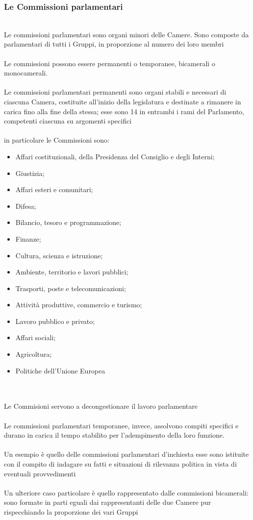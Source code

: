 \documentclass{report}
\begin{document}
\subsubsection{Le Commissioni parlamentari}
\\
Le commissioni parlamentari sono organi minori delle Camere. Sono composte da parlamentari di tutti i Gruppi, in proporzione al numero dei loro membri
\\
\\
Le commissioni possono essere permanenti o temporanee, bicamerali o monocamerali.
\\
\\
Le commissioni parlamentari permanenti sono organi stabili e necessari di ciascuna Camera, costituite all'inizio della legislatura e destinate a rimanere in carica fino alla fine della stessa; esse sono 14 in entrambi i  rami del Parlamento, competenti ciascuna su argomenti specifici
\\
\\
in particolare le Commissioni sono:
\\
\begin{itemize}
  \item Affari costituzionali, della Presidenza del Consiglio e degli Interni;
  \item Giustizia;
  \item Affari esteri e comunitari;
  \item Difesa;
  \item Bilancio, tesoro e programmazione;
  \item Finanze;
  \item Cultura, scienza e istruzione;
  \item Ambiente, territorio e lavori pubblici;
  \item Trasporti, poste e telecomunicazioni;
  \item Attività produttive, commercio e turismo;
  \item Lavoro pubblico e privato;
  \item Affari sociali;
  \item Agricoltura;
  \item Politiche dell'Unione Europea
\end{itemize}
\\
\\
Le Commisioni servono a decongestionare il lavoro parlamentare
\\
\\
Le commissioni parlamentari temporanee, invece, assolvono compiti specifici e durano in carica il tempo stabilito per l'adempimento della loro funzione.
\\
\\
Un esempio è quello delle commissioni parlamentari d'inchiesta esse sono istituite con il compito di indagare su fatti e situazioni di rilevanza politica in vista di eventuali provvedimenti 
\\
\\
Un ulteriore caso particolare è quello rappresentato dalle commissioni bicamerali: sono formate in parti eguali dai rappresentanti delle due Camere pur rispecchiando la proporzione dei vari Gruppi

\end{document}
